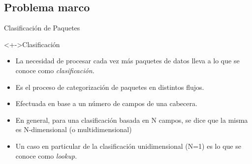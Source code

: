 \documentclass[xcolor=dvipsnames]{beamer}
\begin{document}

\subsection{Problema marco}
\begin{frame}{Clasificación de Paquetes}

 \begin{block}<+->{Clasificación}   
    \begin{itemize}
      \scriptsize
      \item La necesidad de procesar cada vez más paquetes de datos lleva a lo que se conoce como \textit{clasificación.}
      \item Es el proceso de categorización de paquetes en distintos flujos.
      \item Efectuada en base a un número de campos de una cabecera.
      \item En general, para una clasificación basada en N campos, se dice que la misma es N-dimensional (o multidimensional) 
      \item Un caso en particular de la clasificación unidimensional (N=1) es lo que se conoce como \textit{lookup}.     
    \end{itemize}
  \end{block}

\end{frame}
\end{document}
